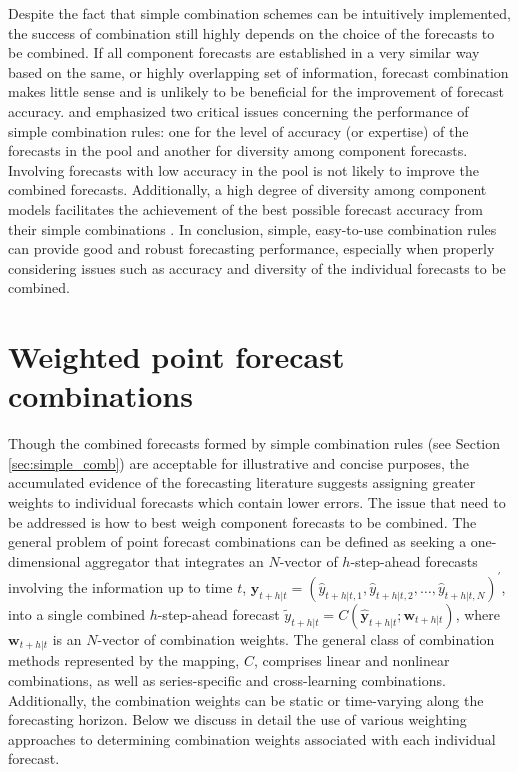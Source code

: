 \documentclass[11pt]{article}
\newcommand{\YF}[2][]{\todo[#1]{\footnotesize\sf \textbf{Yanfei:} #2}}
\begin{document}
Despite the fact that simple combination schemes can be intuitively implemented, the success of combination still highly depends on the choice of the forecasts to be combined. If all component forecasts are established in a very similar way based on the same, or highly overlapping set of information, forecast combination makes little sense and is unlikely to be beneficial for the improvement of forecast accuracy. \citet{Mannes2014-dl} and \citet{Lichtendahl2020-ut} emphasized two critical issues concerning the performance of simple combination rules\YF[fancyline]{Ambiguity decomposition.}: one for the level of accuracy (or expertise) of the forecasts in the pool and another for diversity among component forecasts. Involving forecasts with low accuracy in the pool is not likely to improve the combined forecasts. Additionally, a high degree of diversity among component models facilitates the achievement of the best possible forecast accuracy from their simple combinations \citep{Thomson2019-al}. In conclusion, simple, easy-to-use combination rules can provide good and robust forecasting performance, especially when properly considering issues such as accuracy and diversity of the individual forecasts to be combined.


\section{Weighted point forecast combinations}
\label{sec:weighted_comb}

Though the combined forecasts formed by simple combination rules (see Section \ref{sec:simple_comb}) are acceptable for illustrative and concise purposes, the accumulated evidence of the forecasting literature suggests assigning greater weights to individual forecasts which contain lower errors. The issue that need to be addressed is how to best weigh component forecasts to be combined. The general problem of point forecast combinations can be defined as seeking a one-dimensional aggregator that integrates an $N$-vector of $h$-step-ahead forecasts involving the information up to time $t$, $\hat{\boldsymbol{y}}_{t+h|t}=\left(\hat{y}_{t+h|t, 1}, \hat{y}_{t+h|t, 2}, \ldots, \hat{y}_{t+h|t, N}\right)^{\prime}$, into a single combined $h$-step-ahead forecast $\tilde{y}_{t+h|t}=C\left(\hat{\boldsymbol{y}}_{t+h|t} ; \boldsymbol{w}_{t+h|t}\right)$, where $\boldsymbol{w}_{t+h|t}$ is an $N$-vector of combination weights. The general class of combination methods represented by the mapping, $C$, comprises linear and nonlinear combinations, as well as series-specific and cross-learning combinations. Additionally, the combination weights can be static or time-varying along the forecasting horizon. Below we discuss in detail the use of various weighting approaches to determining combination weights associated with each individual forecast.
\end{document}
